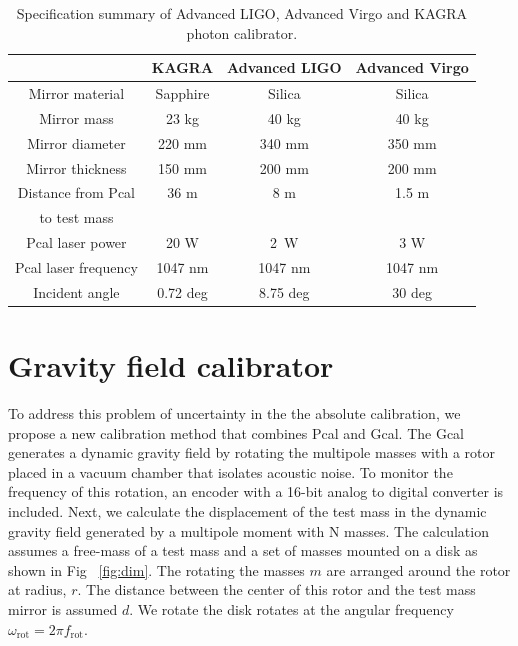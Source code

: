 \documentclass[%
 reprint,
superscriptaddress,
 amsmath,amssymb,
 aps,
]{revtex4-1}
\begin{document}
\begin{table}
\begin{center}
\caption{Specification summary of Advanced LIGO, Advanced Virgo and KAGRA photon calibrator. \label{pcal}}
\footnotesize
\begin{tabular}{cccc}
\hline
& KAGRA& Advanced LIGO& Advanced Virgo \\
\hline
Mirror material & Sapphire & Silica & Silica \\
 Mirror mass & 23 kg & 40 kg & 40 kg \\
  Mirror diameter & 220 mm & 340 mm & 350 mm \\
    Mirror thickness & 150 mm & 200 mm & 200 mm \\
 Distance from Pcal & 36 m & 8 m & 1.5 m \\
to test mass &&& \\
  Pcal laser power & 20 W & 2~W & 3 W \\
  Pcal laser frequency & 1047 nm & 1047 nm &1047 nm\\
  Incident angle& 0.72 deg & 8.75 deg &30 deg \\
  \hline
\end{tabular}
\end{center}
\end{table}

\section{Gravity field calibrator} \label{sec:Gcal}
To address  this problem of uncertainty in the the absolute calibration, we propose a new calibration method that combines Pcal and Gcal. %
 The Gcal generates a dynamic gravity field  by rotating the multipole masses with a rotor placed in a vacuum chamber that isolates acoustic noise. To monitor the frequency of this rotation, an encoder with %
a 16-bit analog to digital converter is included.
Next, we calculate the displacement of the test mass in the dynamic gravity field generated by a multipole moment with N masses.
The calculation assumes a free-mass of a test mass and a set of masses mounted on a disk as shown in Fig ~\ref{fig:dim}.
The rotating the masses $m$ are arranged around the rotor at radius, $r$. 
The distance between the center of this rotor and the test mass mirror is assumed $d$.
We rotate the disk rotates at the angular frequency $\omega_{\mathrm{rot}}=2\pi f_{\mathrm{rot}}$.

\end{document}
